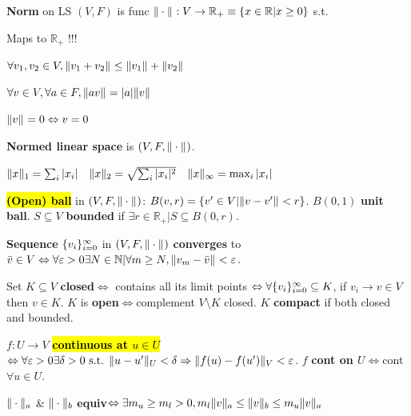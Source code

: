 
\begin{Definition}
\textbf{Norm} on LS $(V,F)$ is func $\|\cdot\|_{}:V\to\mathbb R_+\equiv\{x\in\mathbb R|x\ge 0\}$ s.t.
\begin{enumerate*}[label=\protect\circled{\arabic*}]
  \item[\circled{0}] Maps to $\mathbb R_+$ !!!
  \item $\forall v_1,v_2\in V,\|v_1+v_2\|_{}\le\|v_1\|_{}+\|v_2\|_{}$
  \item $\forall v\in V,\forall a\in F,\|av\|_{}=|a|\|v\|_{}$
  \item $\|v\|_{}=0\Leftrightarrow v=0$
\end{enumerate*}
\end{Definition}
\begin{Definition}
\textbf{Normed linear space} is $(V,F,\|\cdot\|_{})$.
\end{Definition}
\begin{center}
$\|x\|_{1}=\sum_i|x_i|\quad
\|x\|_{2}=\sqrt{\sum_i|x_i|^2}\quad
\|x\|_{\infty}=\max_i|x_i|$
\end{center}

\begin{Definition}
\textbf{\hl{(Open) ball}} in $(V,F,\|\cdot\|_{})$: $B(v,r)=\{v'\in V|\|v-v'\|_{}<r\}$. 
$B(0,1)$ \textbf{unit ball}.  $S\subseteq V$ \textbf{bounded} if $\exists r\in\mathbb R_+|S\subseteq B(0,r)$.

\textbf{Sequence} $\{v_{i}\}_{i=0}^{\infty}$ in $(V,F,\|\cdot\|_{})$ \textbf{converges} to $\bar v\in V\Leftrightarrow\forall\varepsilon>0\exists N\in\mathbb N|\forall m\ge N,\|v_m-\bar v\|_{}<\varepsilon$.

Set $K\subseteq V$ \textbf{closed}$\Leftrightarrow$ contains all its limit points $\Leftrightarrow\forall\{v_{i}\}_{i=0}^{\infty}\subseteq K$, if $v_i\to v\in V$ then $v\in K$. $K$ is \textbf{open}$\Leftrightarrow$complement $V\setminus K$ closed. $K$ \textbf{compact} if both closed and bounded.

$f:U\to V$ \textbf{\hl{continuous at $u\in U$}} $\Leftrightarrow\forall\varepsilon>0\exists\delta>0\text{ s.t. }\|u-u'\|_{U}<\delta\Rightarrow\|f(u)-f(u')\|_{V}<\varepsilon$.
$f$ \textbf{cont on $U$}$\Leftrightarrow$cont $\forall u\in U$.
\end{Definition}
\begin{Theorem}
$\|\cdot\|_{a}$ \& $\|\cdot\|_{b}$ \textbf{equiv}$\Leftrightarrow\exists m_u\ge m_l> 0,m_l\|v\|_{a}\le\|v\|_{b}\le m_u\|v\|_{a}$
\end{Theorem}

